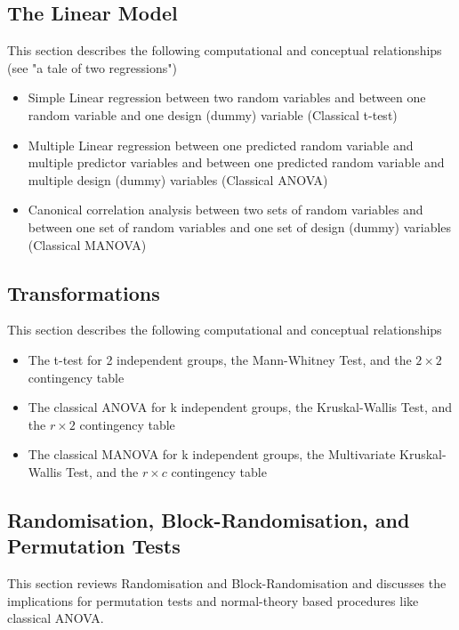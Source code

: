 \subsection{The Linear Model}

This section describes the following computational and conceptual relationships (see "a tale of two regressions")


\begin{itemize}
	\item Simple Linear regression between two random variables and between one random variable and one design (dummy)  variable (Classical t-test)
	\item Multiple Linear regression between one predicted random variable and multiple predictor variables and between one predicted random variable and multiple design (dummy)  variables (Classical ANOVA)
	\item Canonical correlation analysis between two sets of random variables and between one set of random variables and one set of design (dummy)  variables (Classical MANOVA)
\end{itemize}


\subsection{Transformations}

This section describes the following computational and conceptual relationships

\begin{itemize}
	\item The t-test for 2 independent groups, the Mann-Whitney Test, and the $2 \times 2$ contingency table
	\item The classical ANOVA for k independent groups, the Kruskal-Wallis Test, and the $r \times 2$ contingency table
	\item The classical MANOVA for k independent groups, the Multivariate Kruskal-Wallis Test, and the $r \times c$ contingency table
\end{itemize}



\subsection{Randomisation, Block-Randomisation, and Permutation Tests}

This section reviews Randomisation and Block-Randomisation and discusses the implications for permutation tests and normal-theory based procedures like classical ANOVA.

